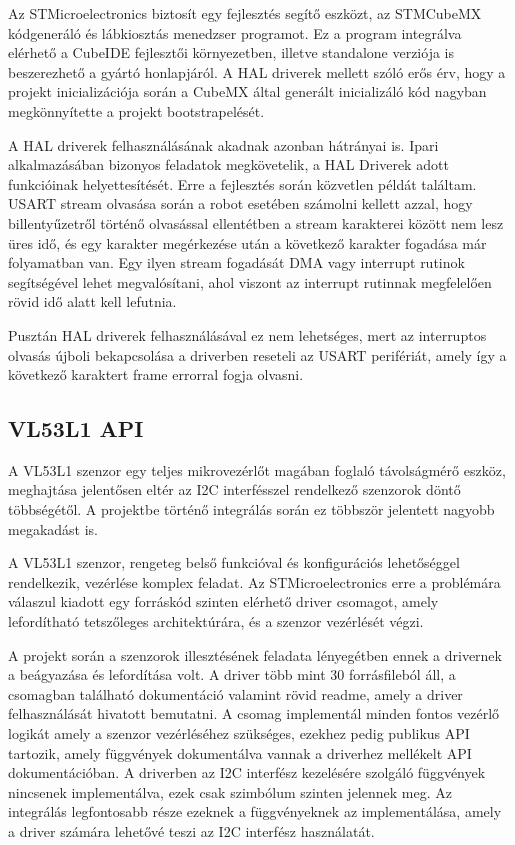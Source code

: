 Az STMicroelectronics biztosít egy fejlesztés segítő eszközt, az STMCubeMX
kódgeneráló és lábkiosztás menedzser programot. Ez a program integrálva elérhető
a CubeIDE fejlesztői környezetben, illetve standalone verziója is beszerezhető a
gyártó honlapjáról. A HAL driverek mellett szóló erős érv, hogy a projekt
inicializációja során a CubeMX által generált inicializáló kód nagyban
megkönnyítette a projekt bootstrapelését.

\medskip

A HAL driverek felhasználásának akadnak azonban hátrányai is. Ipari
alkalmazásában bizonyos feladatok megkövetelik, a HAL Driverek adott funkcióinak
helyettesítését. Erre a fejlesztés során közvetlen példát találtam.  USART stream
olvasása során a robot esetében számolni kellett azzal, hogy billentyűzetről
történő olvasással ellentétben a stream karakterei között nem lesz üres idő, és
egy karakter megérkezése után a következő karakter fogadása már folyamatban
van. Egy ilyen stream fogadását DMA vagy interrupt rutinok segítségével lehet
megvalósítani, ahol viszont az interrupt rutinnak megfelelően rövid idő alatt
kell lefutnia.

Pusztán HAL driverek felhasználásával ez nem lehetséges, mert az interruptos
olvasás újboli bekapcsolása a driverben reseteli az USART perifériát, amely így a
következő karaktert frame errorral fogja olvasni.

\subsection{VL53L1 API}

A VL53L1 szenzor egy teljes mikrovezérlőt magában foglaló távolságmérő eszköz,
meghajtása jelentősen eltér az I2C interfésszel rendelkező szenzorok döntő
többségétől. A projektbe történő integrálás során ez többször jelentett nagyobb
megakadást is.

\medskip

A VL53L1 szenzor, rengeteg belső funkcióval és konfigurációs lehetőséggel
rendelkezik, vezérlése komplex feladat. Az STMicroelectronics erre a problémára
válaszul kiadott egy forráskód szinten elérhető driver csomagot, amely
lefordítható tetszőleges architektúrára, és a szenzor vezérlését végzi.

A projekt során a szenzorok illesztésének feladata lényegétben ennek a drivernek
a beágyazása és lefordítása volt.  A driver több mint 30 forrásfileból áll, a
csomagban található dokumentáció valamint rövid readme, amely a driver
felhasználását hivatott bemutatni. A csomag implementál minden fontos vezérlő
logikát amely a szenzor vezérléséhez szükséges, ezekhez pedig publikus API
tartozik, amely függvények dokumentálva vannak a driverhez mellékelt API
dokumentációban. A driverben az I2C interfész kezelésére szolgáló függvények
nincsenek implementálva, ezek csak szimbólum szinten jelennek meg. Az integrálás
legfontosabb része ezeknek a függvényeknek az implementálása, amely a driver
számára lehetővé teszi az I2C interfész használatát.

